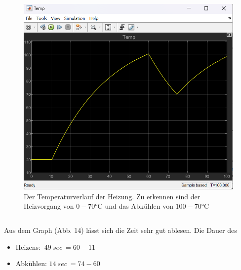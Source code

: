 \documentclass{article}
\begin{document}
		\subsection{}
			\begin{figure}[h]
				\centering
				\includegraphics[scale=0.8]{Aufgabe4cTempDisplay.png}
				\caption{Der Temperaturverlauf der Heizung. Zu erkennen sind der Heizvorgang von $0 - 70$°C und das Abkühlen von $100 - 70$°C}
				\label{fig_14: Aufg_4c_TempGraph}
			\end{figure}
		\subsection{}
			Aus dem Graph (Abb. 14) lässt sich die Zeit sehr gut ablesen. Die Dauer des
			\begin{itemize}
				\item Heizens: $\ 49\ sec\ = 60 - 11$
				\item Abkühlen: $ 14\ sec\ = 74 - 60$
			\end{itemize}
		
\end{document}
